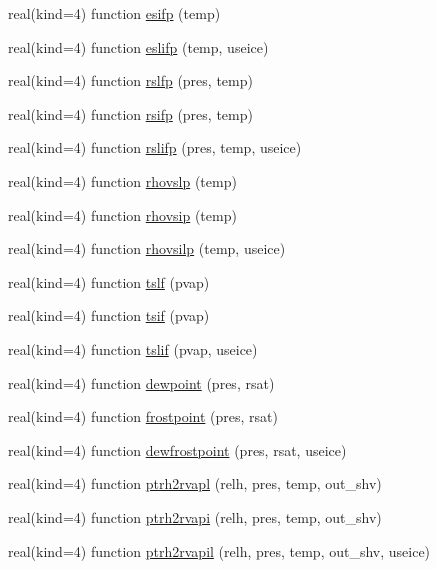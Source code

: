 \begin{DoxyCompactItemize}
\item 
real(kind=4) function \hyperlink{namespacetherm__lib_a4c1f51941fe39db465e2fba15c887667}{esifp} (temp)
\item 
real(kind=4) function \hyperlink{namespacetherm__lib_ac882ac1ca8840594af71761fc7c42306}{eslifp} (temp, useice)
\item 
real(kind=4) function \hyperlink{namespacetherm__lib_ae0635cd1cd9e80dafd1cb89243c41e02}{rslfp} (pres, temp)
\item 
real(kind=4) function \hyperlink{namespacetherm__lib_a55d327a08b380623cd2b036cecdef9f2}{rsifp} (pres, temp)
\item 
real(kind=4) function \hyperlink{namespacetherm__lib_a3ba8735d59b87e78d614f76ed778b639}{rslifp} (pres, temp, useice)
\item 
real(kind=4) function \hyperlink{namespacetherm__lib_a47c1103775af2f781f2fabf678217375}{rhovslp} (temp)
\item 
real(kind=4) function \hyperlink{namespacetherm__lib_a6bc712cfc32b1dcebed47c8a0942b92f}{rhovsip} (temp)
\item 
real(kind=4) function \hyperlink{namespacetherm__lib_a0d35dbf53cc9ae9c3f1b5a5d21126bd8}{rhovsilp} (temp, useice)
\item 
real(kind=4) function \hyperlink{namespacetherm__lib_af4ba481a98f65fb3f1e2ff6fb30ace23}{tslf} (pvap)
\item 
real(kind=4) function \hyperlink{namespacetherm__lib_a45fb7d736264472e118c794a243911fe}{tsif} (pvap)
\item 
real(kind=4) function \hyperlink{namespacetherm__lib_a7448671da269afe05b39189c581f790b}{tslif} (pvap, useice)
\item 
real(kind=4) function \hyperlink{namespacetherm__lib_a4a7268a45c9e0384a7711ec8b1d2b24e}{dewpoint} (pres, rsat)
\item 
real(kind=4) function \hyperlink{namespacetherm__lib_aa7fff31ade0f9d6070e4bc986e0f5e24}{frostpoint} (pres, rsat)
\item 
real(kind=4) function \hyperlink{namespacetherm__lib_a0611d2fb3b39f0af58f3417bd88c43f0}{dewfrostpoint} (pres, rsat, useice)
\item 
real(kind=4) function \hyperlink{namespacetherm__lib_a31b5123d35b5fab2d91701e148b5ac1d}{ptrh2rvapl} (relh, pres, temp, out\+\_\+shv)
\item 
real(kind=4) function \hyperlink{namespacetherm__lib_ac6a566c85228fe3eb44352086e7b22e2}{ptrh2rvapi} (relh, pres, temp, out\+\_\+shv)
\item 
real(kind=4) function \hyperlink{namespacetherm__lib_a0b228d623c4a7506f51e5ffb0af0652f}{ptrh2rvapil} (relh, pres, temp, out\+\_\+shv, useice)

\end{DoxyCompactItemize}
